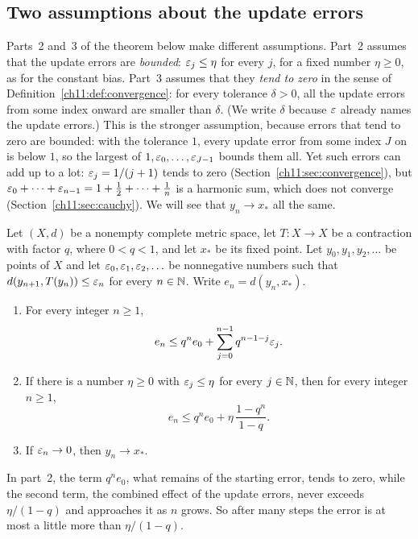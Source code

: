 \subsection*{Two assumptions about the update errors}
Parts~2 and~3 of the theorem below make different assumptions. Part~2 assumes that the update errors are \emph{bounded}: $\varepsilon_j\le\eta$ for every $j$, for a fixed number $\eta\ge0$, as for the constant bias. Part~3 assumes that they \emph{tend to zero} in the sense of Definition~\ref{ch11:def:convergence}: for every tolerance $\delta>0$, all the update errors from some index onward are smaller than $\delta$. (We write $\delta$ because $\varepsilon$ already names the update errors.) This is the stronger assumption, because errors that tend to zero are bounded: with the tolerance $1$, every update error from some index $J$ on is below $1$, so the largest of $1,\varepsilon_0,\ldots,\varepsilon_{J-1}$ bounds them all. Yet such errors can add up to a lot: $\varepsilon_j=1/(j+1)$ tends to zero (Section~\ref{ch11:sec:convergence}), but $\varepsilon_0+\cdots+\varepsilon_{n-1}=1+\frac12+\cdots+\frac1n$ is a harmonic sum, which does not converge (Section~\ref{ch11:sec:cauchy}). We will see that $y_n\to x_*$ all the same.

\par\noindent\begin{minipage}{\linewidth}
\begin{theorem}\label{thm:inexact}
Let $(X,d)$ be a nonempty complete metric space, let $T:X\to X$ be a contraction with factor $q$, where $0<q<1$, and let $x_*$ be its fixed point. Let $y_0,y_1,y_2,\ldots$ be points of $X$ and let $\varepsilon_0,\varepsilon_1,\varepsilon_2,\ldots$ be nonnegative numbers such that $d(y_{n+1},T(y_n))\le\varepsilon_n$ for every $n\in\mathbb N$. Write $e_n=d(y_n,x_*)$.
\begin{enumerate}
\item For every integer $n\ge1$,
\[
 e_n\le q^n e_0+\sum_{j=0}^{n-1}q^{n-1-j}\varepsilon_j.
\]
\item If there is a number $\eta\ge0$ with $\varepsilon_j\le\eta$ for every $j\in\mathbb N$, then for every integer $n\ge1$,
\[
 e_n\le q^n e_0+\eta\,\frac{1-q^n}{1-q}.
\]
\item If $\varepsilon_n\to0$, then $y_n\to x_*$.
\end{enumerate}
\end{theorem}
\end{minipage}\par

In part~2, the term $q^ne_0$, what remains of the starting error, tends to zero, while the second term, the combined effect of the update errors, never exceeds $\eta/(1-q)$ and approaches it as $n$ grows. So after many steps the error is at most a little more than $\eta/(1-q)$.

